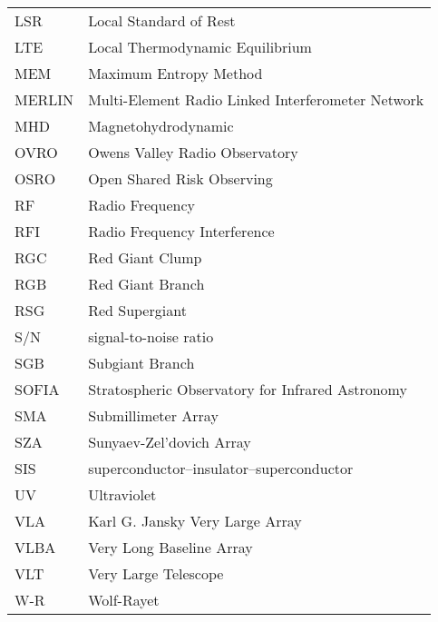 \begin{center}
\begin{longtable}{ll}
LSR & Local Standard of Rest \\
LTE & Local Thermodynamic Equilibrium \\
MEM & Maximum Entropy Method\\
MERLIN & Multi-Element Radio Linked Interferometer Network\\
MHD & Magnetohydrodynamic \\
OVRO & Owens Valley Radio Observatory \\
OSRO & Open Shared Risk Observing \\
RF & Radio Frequency \\
RFI & Radio Frequency Interference \\
RGC & Red Giant Clump \\
RGB & Red Giant Branch \\
RSG & Red Supergiant \\
S/N & signal-to-noise ratio\\
SGB & Subgiant Branch \\
SOFIA & Stratospheric Observatory for Infrared Astronomy\\
SMA & Submillimeter Array \\
SZA & Sunyaev-Zel'dovich Array \\
SIS & superconductor–insulator–superconductor \\
UV & Ultraviolet \\
VLA & Karl G. Jansky Very Large Array \\
VLBA & Very Long Baseline Array \\
VLT & Very Large Telescope \\
W-R & Wolf-Rayet\\
\end{longtable}
\end{center}

